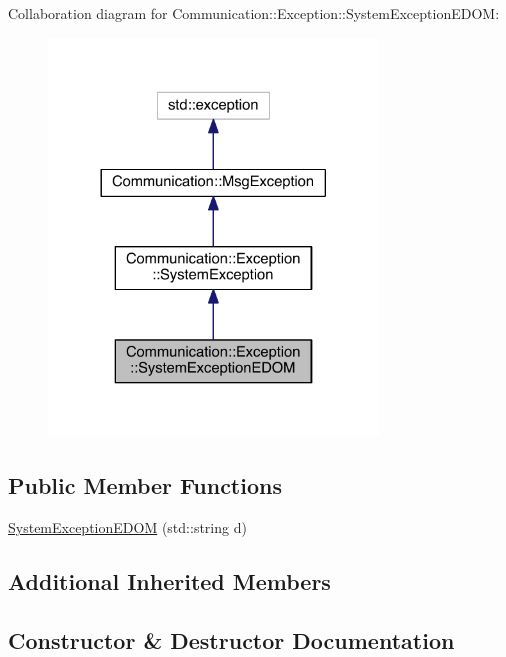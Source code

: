 Collaboration diagram for Communication\+:\+:Exception\+:\+:System\+Exception\+E\+D\+O\+M\+:\nopagebreak
\begin{figure}[H]
\begin{center}
\leavevmode
\includegraphics[width=248pt]{class_communication_1_1_exception_1_1_system_exception_e_d_o_m__coll__graph}
\end{center}
\end{figure}
\subsection*{Public Member Functions}
\begin{DoxyCompactItemize}
\item 
\hyperlink{class_communication_1_1_exception_1_1_system_exception_e_d_o_m_a958262e0a423cfbc4973160c8ad32faa}{System\+Exception\+E\+D\+O\+M} (std\+::string d)
\end{DoxyCompactItemize}
\subsection*{Additional Inherited Members}


\subsection{Constructor \& Destructor Documentation}
\hypertarget{class_communication_1_1_exception_1_1_system_exception_e_d_o_m_a958262e0a423cfbc4973160c8ad32faa}{}
